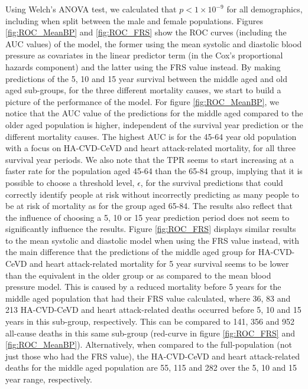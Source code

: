 \documentclass[
]{article}
\begin{document}
Using Welch's ANOVA test, we calculated that \(p<1\times 10^{-9}\) for all demographics, including when split between the male and female populations. Figures \ref{fig:ROC_MeanBP} and \ref{fig:ROC_FRS} show the ROC curves (including the AUC values) of the model, the former using the mean systolic and diastolic blood pressure as covariates in the linear predictor term (in the Cox's proportional hazards component) and the latter using the FRS value instead. By making predictions of the 5, 10 and 15 year survival between the middle aged and old aged sub-groups, for the three different mortality causes, we start to build a picture of the performance of the model. For figure \ref{fig:ROC_MeanBP}, we notice that the AUC value of the predictions for the middle aged compared to the older aged population is higher, independent of the survival year prediction or the different mortality causes. The highest AUC is for the 45-64 year old population with a focus on HA-CVD-CeVD and heart attack-related mortality, for all three survival year periods. We also note that the TPR seems to start increasing at a faster rate for the population aged 45-64 than the 65-84 group, implying that it is possible to choose a threshold level, \(\epsilon\), for the survival predictions that could correctly identify people at risk without incorrectly predicting as many people to be at risk of mortality as for the group aged 65-84. The results also reflect that the influence of choosing a 5, 10 or 15 year prediction period does not seem to significantly influence the results. Figure \ref{fig:ROC_FRS} displays similar results to the mean systolic and diastolic model when using the FRS value instead, with the main difference that the predictions of the middle aged group for HA-CVD-CeVD and heart attack-related mortality for 5 year survival seems to be lower than the equivalent in the older group or as compared to the mean blood pressure model. This is caused by a reduced mortality before 5 years for the middle aged population that had their FRS value calculated, where 36, 83 and 213 HA-CVD-CeVD and heart attack-related deaths occurred before 5, 10 and 15 years in this sub-group, respectively. This can be compared to 141, 356 and 952 all-cause deaths in this same sub-group (red-curve in figure \ref{fig:ROC_FRS} and \ref{fig:ROC_MeanBP}). Alternatively, when compared to the full-population (not just those who had the FRS value), the HA-CVD-CeVD and heart attack-related deaths for the middle aged population are 55, 115 and 282 over the 5, 10 and 15 year range, respectively.
\end{document}
